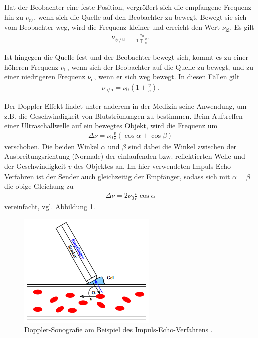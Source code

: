 \noindent
Hat der Beobachter eine feste Position, vergrößert sich die empfangene Frequenz hin zu $\nu_\text{gr}$,
wenn sich die Quelle auf den Beobachter zu bewegt.
Bewegt sie sich vom Beobachter weg, wird die Frequenz kleiner und erreicht den Wert $\nu_\text{kl}$.
Es gilt 
\begin{align}
    \nu_\text{gr/kl} = \frac{\nu_0}{1\mp \frac{v}{c}}.
    \label{eq:gr_kl}
\end{align}

\noindent
Ist hingegen die Quelle fest und der Beobachter bewegt sich, kommt es zu einer höheren Frequenz $\nu_\text{h}$, wenn sich der Beobachter
auf die Quelle zu bewegt, und zu einer niedrigeren Frequenz $\nu_\text{n}$, wenn er sich weg bewegt.
In diesen Fällen gilt
\begin{align}
    \nu_\text{h/n} = \nu_0 \left(1\pm \frac{v}{c}\right).
    \label{eq:h_n}
\end{align}

\noindent
Der Doppler-Effekt findet unter anderem in der Medizin seine Anwendung, um z.B. die Geschwindigkeit von Blutströmungen
zu bestimmen.
Beim Auftreffen einer Ultraschallwelle auf ein bewegtes Objekt, wird die Frequenz um 
\begin{align}
    \Delta \nu = \nu_0 \frac{v}{c} \left(\cos \alpha + \cos \beta\right)
\end{align}
verschoben.
Die beiden Winkel $\alpha$ und $\beta$ sind dabei die Winkel zwischen der Ausbreitungsrichtung (Normale) der einlaufenden bzw.
reflektierten Welle und der Geschwindigkeit $v$ des Objektes an.
Im hier verwendeten Impuls-Echo-Verfahren ist der Sender auch gleichzeitig der Empfänger, sodass sich mit $\alpha = \beta$
die obige Gleichung zu 
\begin{align}
    \Delta \nu = 2 \nu_0 \frac{v}{c} \cos \alpha
    \label{eq:verschiebung}
\end{align}
vereinfacht, vgl. Abbildung \ref{fig:impuls_echo}.

\begin{figure}[H]
    \centering
    \includegraphics[height = 5 cm]{Abbildungen/impuls_echo.png}
    \caption{Doppler-Sonografie am Beispiel des Impuls-Echo-Verfahrens \cite{man:us3}.}
    \label{fig:impuls_echo}
\end{figure}